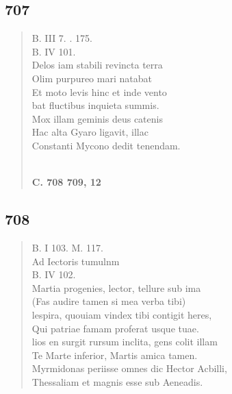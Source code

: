 \documentclass[11pt, a4paper]{report}
\begin{document}
            \subsection*{707}
      \begin{verse}
      B. III 7. . 175. \\ B. IV 101. \\ Delos iam stabili revincta terra \\ Olim purpureo mari natabat \\ Et moto levis hinc et inde vento \\ bat fluctibus inquieta summis. \\ Mox illam geminis deus catenis \\ Hac alta Gyaro ligavit, illac \\ Constanti Mycono dedit tenendam. \\ 
        ﻿\pagebreak 
     \marginpar{[174]} \begin{center} \textbf{C. 708 709, 12} \end{center}
      \end{verse}
  
            \subsection*{708}
      \begin{verse}
      B. I 103. M. 117. \\ Ad Iectoris tumulnm \\ B. IV 102. \\ Martia progenies, lector, tellure sub ima \\ (Fas audire tamen si mea verba tibi) \\ lespira, quouiam vindex tibi contigit heres, \\ Qui patriae famam proferat usque tuae. \\ lios en surgit rursum inclita, gens colit illam \\ Te Marte inferior, Martis amica tamen. \\ Myrmidonas periisse omnes dic Hector Acbilli, \\ Thessaliam et magnis esse sub Aeneadis. \\ 
      \end{verse}
  
\end{document}
